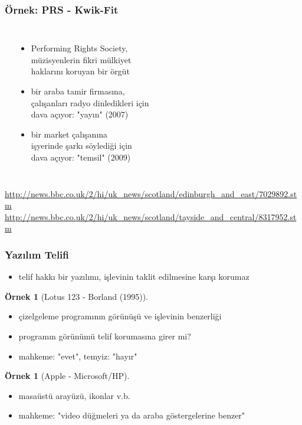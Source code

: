 \documentclass[dvipsnames]{beamer}
\theoremstyle{definition}
\theoremstyle{example}
\newtheorem{ornek}[theorem]{Örnek}
\theoremstyle{plain}
\begin{document}
\begin{frame}
  \frametitle{Örnek: PRS - Kwik-Fit}

  \begin{columns}
    \begin{center}
    \end{center}

    \begin{itemize}
      \item Performing Rights Society,\\
        müzisyenlerin fikri mülkiyet\\
        haklarını koruyan bir örgüt
      \item bir araba tamir firmasına,\\
        çalışanları radyo dinledikleri için\\
        dava açıyor: "yayın" (2007)
      \item bir market çalışanına\\
        işyerinde şarkı söylediği için\\
        dava açıyor: "temsil" (2009)
    \end{itemize}
  \end{columns}

  \medskip
  \tiny{\url{http://news.bbc.co.uk/2/hi/uk_news/scotland/edinburgh_and_east/7029892.stm}}\\
  \tiny{\url{http://news.bbc.co.uk/2/hi/uk_news/scotland/tayside_and_central/8317952.stm}}\\
\end{frame}

\begin{frame}
  \frametitle{Yazılım Telifi}

  \begin{itemize}
    \item telif hakkı bir yazılımı, işlevinin taklit edilmesine karşı korumaz
  \end{itemize}

  \pause
  \begin{ornek}[Lotus 123 - Borland (1995)]
    \begin{itemize}
      \item çizelgeleme programının görünüşü ve işlevinin benzerliği
      \item programın görünümü telif korumasına girer mi?
      \item mahkeme: "evet", temyiz: "hayır"
    \end{itemize}
  \end{ornek}

  \pause
  \begin{ornek}[Apple - Microsoft/HP]
    \begin{itemize}
      \item masaüstü arayüzü, ikonlar v.b.
      \item mahkeme: "video düğmeleri ya da araba göstergelerine benzer"
    \end{itemize}
  \end{ornek}
\end{frame}
\end{document}
